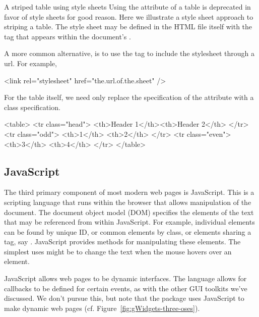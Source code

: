 \begin{example}{A striped table using style sheets}{}
  Using the   attribute of a table is deprecated in favor of
  style sheets for good reason. Here we illustrate a style sheet
  approach to striping a table. The style sheet may be defined in the
  HTML file itself with the  tag that appears within the
  document's . 
  
 A more common alternative, is to use the  tag to include
 the stylesheet through a url. For example,
\begin{HTMLinput}
<link rel="stylesheet" href="the.url.of.the.sheet" />
\end{HTMLinput}

 For the table itself, we need only replace the specification of the attribute with a
 class specification.
 \begin{HTMLinput}
<table>
  <tr class="head">
    <th>Header 1</th><th>Header 2</th>
  </tr>
  <tr class="odd">
    <th>1</th> <th>2</th>
  </tr>
  <tr class="even">
    <th>3</th> <th>4</th>
  </tr>
</table>
\end{HTMLinput}
  
\end{example}


\subsection{JavaScript}
\label{sec:javascript}

The third primary component of most modern web pages is JavaScript. This is a scripting
language that runs within the browser that allows manipulation of the
document. The document object model (DOM) specifies the elements of
the text that may be referenced from within JavaScript. For example,
individual elements can be found by unique ID, or common elements by class, or
elements sharing a tag, say . JavaScript provides methods for
manipulating these elements. The simplest uses might be to change the
text when the mouse hovers over an element.

JavaScript allows web pages to be dynamic interfaces. The language
allows for callbacks to be defined for certain events, as with the
other GUI toolkits we've discussed. We don't pursue this, but note
that the  package uses JavaScript to make dynamic web
pages (cf. Figure~\ref{fig:gWidgets-three-oses}).

